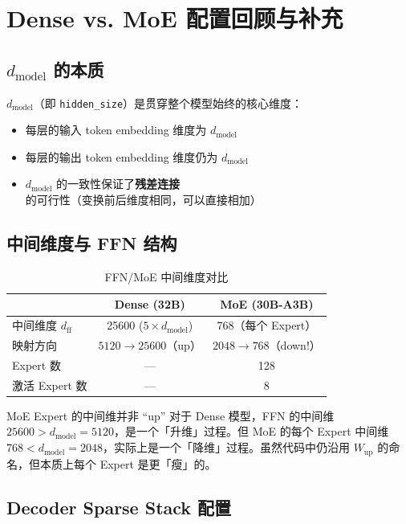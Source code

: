 \section{Dense vs. MoE 配置回顾与补充}

\subsection{$d_{\text{model}}$ 的本质}

$d_{\text{model}}$（即 \texttt{hidden\_size}）是贯穿整个模型始终的核心维度：
\begin{itemize}
  \item 每层的输入 token embedding 维度为 $d_{\text{model}}$
  \item 每层的输出 token embedding 维度仍为 $d_{\text{model}}$
  \item $d_{\text{model}}$ 的一致性保证了\textbf{残差连接}的可行性（变换前后维度相同，可以直接相加）
\end{itemize}

\subsection{中间维度与 FFN 结构}

\begin{table}[H]
\centering
\caption{FFN/MoE 中间维度对比}
\begin{tabular}{lcc}
\toprule
& \textbf{Dense (32B)} & \textbf{MoE (30B-A3B)} \\
\midrule
中间维度 $d_{\text{ff}}$ & 25600 ($5 \times d_{\text{model}}$) & 768（每个 Expert） \\
映射方向 & $5120 \to 25600$（up） & $2048 \to 768$（down!） \\
Expert 数 & --- & 128 \\
激活 Expert 数 & --- & 8 \\
\bottomrule
\end{tabular}
\end{table}

\begin{warningbox}{MoE Expert 的中间维并非 ``up''}
对于 Dense 模型，FFN 的中间维 $25600 > d_{\text{model}} = 5120$，是一个「升维」过程。但 MoE 的每个 Expert 中间维 $768 < d_{\text{model}} = 2048$，实际上是一个「降维」过程。虽然代码中仍沿用 $W_{\text{up}}$ 的命名，但本质上每个 Expert 是更「瘦」的。
\end{warningbox}

\subsection{Decoder Sparse Stack 配置}

